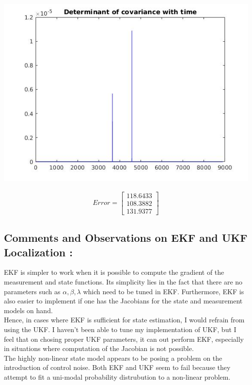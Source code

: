 \documentclass[a4paper,fleqn,11pt]{article}
\theoremstyle{mytheor}
\begin{document}
\begin{center}
\includegraphics[scale = 0.37]{../images/UKF-no-noise-cvt.jpg}
\end{center}

\begin{align*}
Error = \begin{bmatrix}
			118.6433 \\
			108.3882 \\
			131.9377
		\end{bmatrix}
\end{align*}

\subsection{Comments and Observations on EKF and UKF Localization :}

EKF is simpler to work when it is possible to compute the gradient of the measurement and state functions. Its simplicity lies in the fact that there are no parameters such as $\alpha, \beta, \lambda$ which need to be tuned in EKF. Furthermore, EKF is also easier to implement if one has the Jacobians for the state and measurement models on hand. \\
Hence, in cases where EKF is sufficient for state estimation, I would refrain from using the UKF. I haven't been able to tune my implementation of UKF, but I feel that on chosing proper UKF parameters, it can out perform EKF, especially in situations where computation of the Jacobian is not possible.\\
The highly non-linear state model appears to be posing a problem on the introduction of control noise. Both EKF and UKF seem to fail because they attempt to fit a uni-modal probability distrubution to a non-linear problem.
\end{document}
